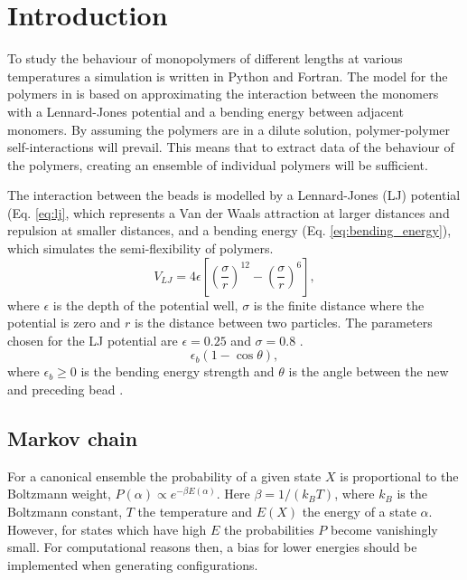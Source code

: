 \section{Introduction}
To study the behaviour of monopolymers of different lengths at various temperatures a simulation is written in Python and Fortran. The model for the polymers in is based on approximating the interaction between the monomers with a Lennard-Jones potential and a bending energy between adjacent monomers. By assuming the polymers are in a dilute solution, polymer-polymer self-interactions will prevail. This means that to extract data of the behaviour of the polymers, creating an ensemble of individual polymers will be sufficient.

The interaction between the beads is modelled by a Lennard-Jones (LJ) potential (Eq. \ref{eq:lj}, which represents a Van der Waals attraction at larger distances and repulsion at smaller distances, and a bending energy (Eq. \ref{eq:bending_energy}), which simulates the semi-flexibility of polymers.
\begin{equation}\label{eq:lj}
    V_{LJ} = 4\epsilon \left[ \left(\frac{\sigma}{r}\right)^{12} - \left(\frac{\sigma}{r}\right)^{6} \right],
\end{equation} where $\epsilon$ is the depth of the potential well, $\sigma$ is the finite distance where the potential is zero and $r$ is the distance between two particles. The parameters chosen for the LJ potential are $\epsilon=0.25$ and $\sigma=0.8$ \cite{jmt}.
\begin{equation}\label{eq:bending_energy}
    \epsilon_b(1-\cos{\theta}),
\end{equation} where $\epsilon_b\geq 0$ is the bending energy strength and $\theta$ is the angle between the new and preceding bead \cite{hsu2011review}.

\subsection{Markov chain}
For a canonical ensemble the probability of a given state $X$ is proportional to the Boltzmann weight, $P(\alpha) \propto e^{-\beta E(\alpha)}$. Here $\beta=1/\left(k_B T\right)$, where $k_B$ is the Boltzmann constant, $T$ the temperature and $E(X)$ the energy of a state $\alpha$. However, for states which have high $E$ the probabilities $P$ become vanishingly small. For computational reasons then, a bias for lower energies should be implemented when generating configurations.

